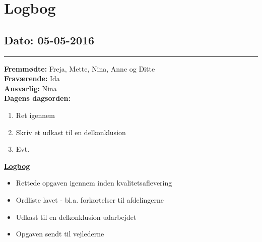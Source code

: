 \chapter{Logbog}
\section{Dato: 05-05-2016}
\hrule
\textbf{Fremmødte:} Freja, Mette, Nina, Anne og Ditte \\
\textbf{Fraværende: } Ida \\
\textbf{Ansvarlig: } Nina \\
\textbf{Dagens dagsorden: }
\begin{enumerate}
\item Ret igennem
\item Skriv et udkast til en delkonklusion
\item Evt.
\end{enumerate}
\underline{\textbf{Logbog}}
\begin{itemize}
\item Rettede opgaven igennem inden kvalitetsaflevering
\item Ordliste lavet - bl.a. forkortelser til afdelingerne
\item Udkast til en delkonklusion udarbejdet
\item Opgaven sendt til vejlederne
\end{itemize}
